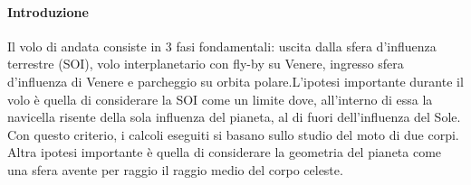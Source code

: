 \documentclass[a4paper]{article}
\begin{document}
\paragraph{Introduzione\newline}
Il volo di andata consiste in 3 fasi fondamentali: uscita dalla sfera d'influenza terrestre (SOI), volo interplanetario con fly-by su Venere, ingresso sfera d'influenza di Venere e parcheggio su orbita polare.\newline L'ipotesi importante durante il volo è quella di considerare la SOI come un limite dove, all'interno di essa la navicella risente della sola influenza del pianeta, al di fuori dell'influenza del Sole. Con questo criterio, i calcoli eseguiti si basano sullo studio del moto di due corpi. \newline Altra ipotesi importante è quella di considerare la geometria del pianeta come una sfera avente per raggio il raggio medio del corpo celeste.
\end{document}
